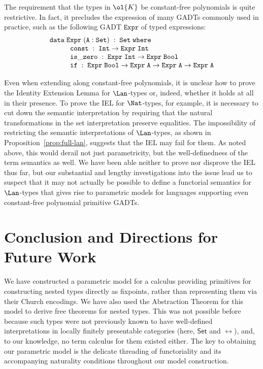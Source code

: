 \documentclass{lmcs}
\theoremstyle{plain}\newtheorem{satz}[thm]{Satz}
\newcommand{\set}{\mathsf{Set}}
\begin{document}
The requirement that the types in $\ol{K}$ be constant-free
polynomials is quite restrictive. In fact, it precludes the expression
of many GADTs commonly used in practice, such as the following GADT
$\mathtt{Expr}$ of typed expressions:
\[
\begin{array}{l}
\mathtt{data\; Expr \;(A : Set)\;:\;Set\;where}\\
\hspace*{0.4in}\mathtt{const\;:\; Int \to Expr\; Int}\\
\hspace*{0.4in}\mathtt{is\_zero\;:\; Expr\; Int \rightarrow Expr\; Bool}\\
\hspace*{0.4in}\mathtt{if\;:\; Expr\; Bool \to Expr\; A \to Expr\; A \to Expr\; A}
\end{array}
\]

Even when extending along constant-free polynomials, it is unclear how
to prove the Identity Extension Lemma for $\Lan$-types or, indeed,
whether it holds at all in their presence. To prove the IEL for
$\Nat$-types, for example, it is necessary to cut down the semantic
interpretation by requiring that the natural transformations in the
set interpretation preserve equalities. The impossibility of
restricting the semantic interpretations of $\Lan$-types, as shown in
Proposition~\ref{prop:full-lan}, suggests that the IEL may fail for
them. As noted above, this would derail not just parametricity, but
the well-definedness of the term semantics as well.  We have been able
neither to prove nor disprove the IEL thus far, but our substantial
and lengthy investigations into the issue lead us to suspect that it
may not actually be possible to define a functorial semantics for
$\Lan$-types that gives rise to parametric models for languages
supporting even constant-free polynomial primitive GADTs.

\section{Conclusion and Directions for Future Work}\label{sec:conclusion}

We have constructed a parametric model for a calculus providing
primitives for constructing nested types directly as fixpoints, rather
than representing them via their Church encodings. We have also used
the Abstraction Theorem for this model to derive free theorems for
nested types. This was not possible before~\cite{jp19} because such
types were not previously known to have well-defined interpretations
in locally finitely presentable categories (here, $\set$ and $\rel$),
and, to our knowledge, no term calculus for them existed either. The
key to obtaining our parametric model is the delicate threading of
functoriality and its accompanying naturality conditions throughout
our model construction.
\end{document}
